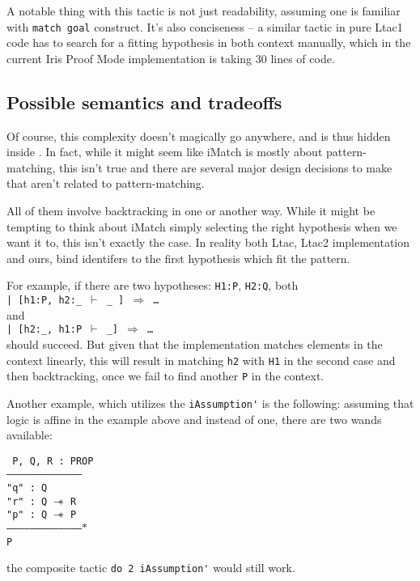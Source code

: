 A notable thing with this tactic is not just readability, assuming one is familiar with \verb|match goal| construct.
It's also conciseness -- a similar tactic in pure Ltac1 code has to search for a fitting hypothesis in both context manually, which in the current Iris Proof Mode implementation is taking 30 lines of code.

\subsection{Possible semantics and tradeoffs}

Of course, this complexity doesn't magically go anywhere, and is thus hidden inside \iMatch.
In fact, while it might seem like iMatch is mostly about pattern-matching, this isn't true and there are several major design decisions to make that aren't related to pattern-matching.

All of them involve backtracking in one or another way.
While it might be tempting to think about iMatch simply selecting the right hypothesis when we want it to, this isn't exactly the case.
In reality both Ltac, Ltac2 implementation and ours, bind identifers to the first hypothesis which fit the pattern.

For example, if there are two hypotheses: \verb|H1:P|, \verb|H2:Q|,
both\\
\texttt{| [h1:P, h2:\_ $\vdash$ \_ ] $\Rightarrow$ \ldots}\\
and\\
\texttt{| [h2:\_, h1:P $\vdash$ \_] $\Rightarrow$ \ldots}\\
should succeed.
But given that the implementation matches elements in the context linearly, this will result in matching \verb|h2| with \verb|H1| in the second case and then backtracking, once we fail to find another \verb|P| in the context.

Another example, which utilizes the \verb|iAssumption'| is the following: assuming that logic is affine in the example above and instead of one, there are two wands available:

\texttt{
P, Q, R : PROP\\
---------------------------------------\\
"q" : Q\\
"r" : Q $\mathrel{-\mkern-6mu*}$ R\\
"p" : Q $\mathrel{-\mkern-6mu*}$ P\\
--------------------------------------$\ast$\\
P
}

the composite tactic \verb|do 2 iAssumption'| would still work.

